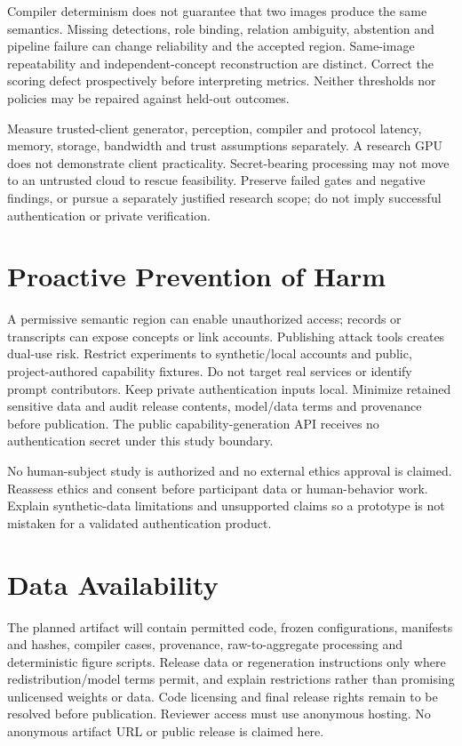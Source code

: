 \documentclass[compsoc,conference,a4paper,10pt,times]{IEEEtran}
\begin{document}
Compiler determinism does not guarantee that two images produce the same semantics. Missing detections, role binding, relation ambiguity, abstention and pipeline failure can change reliability and the accepted region. Same-image repeatability and independent-concept reconstruction are distinct. Correct the scoring defect prospectively before interpreting metrics. Neither thresholds nor policies may be repaired against held-out outcomes.

Measure trusted-client generator, perception, compiler and protocol latency, memory, storage, bandwidth and trust assumptions separately. A research GPU does not demonstrate client practicality. Secret-bearing processing may not move to an untrusted cloud to rescue feasibility. Preserve failed gates and negative findings, or pursue a separately justified research scope; do not imply successful authentication or private verification.

\section{Proactive Prevention of Harm}
\label{sec:harm}
A permissive semantic region can enable unauthorized access; records or transcripts can expose concepts or link accounts. Publishing attack tools creates dual-use risk. Restrict experiments to synthetic/local accounts and public, project-authored capability fixtures. Do not target real services or identify prompt contributors. Keep private authentication inputs local. Minimize retained sensitive data and audit release contents, model/data terms and provenance before publication. The public capability-generation API receives no authentication secret under this study boundary.

No human-subject study is authorized and no external ethics approval is claimed. Reassess ethics and consent before participant data or human-behavior work. Explain synthetic-data limitations and unsupported claims so a prototype is not mistaken for a validated authentication product.

\section{Data Availability}
\label{sec:availability}
The planned artifact will contain permitted code, frozen configurations, manifests and hashes, compiler cases, provenance, raw-to-aggregate processing and deterministic figure scripts. Release data or regeneration instructions only where redistribution/model terms permit, and explain restrictions rather than promising unlicensed weights or data. Code licensing and final release rights remain to be resolved before publication. Reviewer access must use anonymous hosting. No anonymous artifact URL or public release is claimed here.
\end{document}
